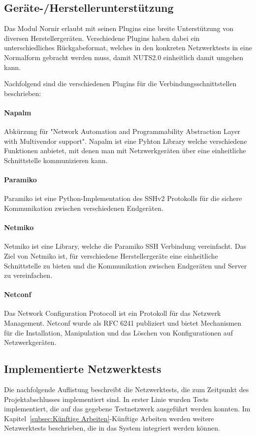 \documentclass[]{subfiles}
\begin{document}
\subsection{Geräte-/Herstellerunterstützung}
Das Modul Nornir erlaubt mit seinen Plugins eine breite Unterstützung von diversen 
Herstellergeräten. 
Verschiedene Plugins haben dabei ein unterschiedliches Rückgabeformat, welches 
in den konkreten Netzwerktests in eine Normalform gebracht werden muss, damit 
NUTS2.0 einheitlich damit umgehen kann.

Nachfolgend sind die verschiedenen Plugins für die Verbindungsschnittstellen beschrieben:

\paragraph{Napalm}
Abkürzung für "Network Automation and Programmability Abstraction Layer with Multivendor support".
Napalm ist eine Pyhton Library welche verschiedene Funktionen anbietet, mit denen man 
mit Netzwerkgeräten über eine einheitliche Schnittstelle kommunizieren kann.

\paragraph{Paramiko}
Paramiko ist eine Python-Implementation des SSHv2 Protokolls für die sichere Kommunikation
zwischen verschiedenen Endgeräten.

\paragraph{Netmiko}
Netmiko ist eine Library, welche die Paramiko SSH Verbindung vereinfacht. 
Das Ziel von Netmiko ist, für verschiedene Herstellergeräte eine einheitliche Schnittstelle
zu bieten und die Kommunikation zwischen Endgeräten und Server zu vereinfachen.

\paragraph{Netconf}
Das Network Configuration Protocoll ist ein Protokoll für das Netzwerk Management.
Netconf wurde als RFC 6241 publiziert und bietet Mechanismen für die Installation,
Manipulation und das Löschen von Konfigurationen auf Netzwerkgeräten.

\newpage

\subsection{Implementierte Netzwerktests}
Die nachfolgende Auflistung beschreibt die Netzwerktests, die zum Zeitpunkt des Projektabschlusses
implementiert sind.
In erster Linie wurden Tests implementiert, die auf das gegebene Testnetzwerk ausgeführt werden
konnten.
Im Kapitel~\ref{subsec:Künftige Arbeiten}-Künftige Arbeiten werden weitere Netzwerktests beschrieben,
die in das System integriert werden können.
\end{document}
